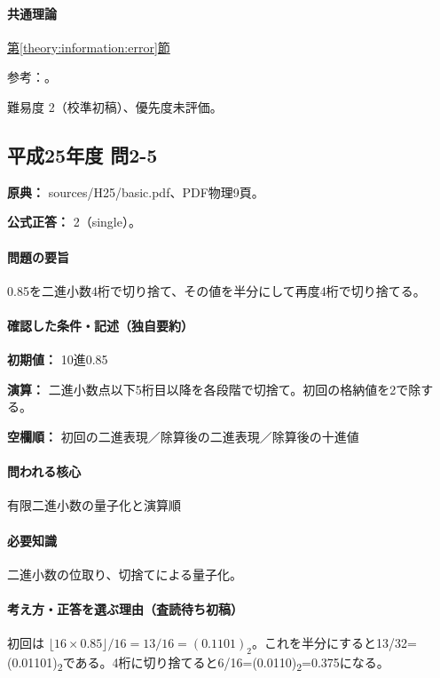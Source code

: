 \paragraph{共通理論} \hyperref[theory:information:error]{第\ref*{theory:information:error}節}

\par 参考：\cite{goldberg1991}。

\par 難易度 2（校準初稿）、優先度未評価。

\subsection{平成25年度 問2-5}
\label{q:h25-reg-basic-2-5}

\noindent\textbf{原典：} sources/H25/basic.pdf、PDF物理9頁。

\textbf{公式正答：} 2（single）。

\paragraph{問題の要旨} 0.85を二進小数4桁で切り捨て、その値を半分にして再度4桁で切り捨てる。

\paragraph{確認した条件・記述（独自要約）}\mbox{}\par

\noindent\textbf{初期値：} 10進0.85\par

\noindent\textbf{演算：} 二進小数点以下5桁目以降を各段階で切捨て。初回の格納値を2で除する。\par

\noindent\textbf{空欄順：} 初回の二進表現／除算後の二進表現／除算後の十進値\par

\paragraph{問われる核心} 有限二進小数の量子化と演算順

\paragraph{必要知識} 二進小数の位取り、切捨てによる量子化。

\paragraph{考え方・正答を選ぶ理由（査読待ち初稿）} 初回は \(\lfloor16\times0.85\rfloor/16=13/16=(0.1101)_2\)。これを半分にすると13/32=\allowbreak{}(0.01101)\textsubscript{2}である。4桁に切り捨てると6/16=\allowbreak{}(0.0110)\textsubscript{2}=0.375になる。

